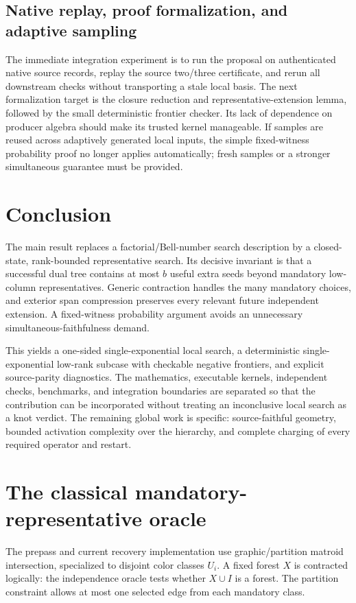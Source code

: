 \documentclass[11pt,letterpaper]{article}
\theoremstyle{definition}
\begin{document}
\subsection{Native replay, proof formalization, and adaptive sampling}
The immediate integration experiment is to run the proposal on authenticated
native source records, replay the source two/three certificate, and rerun
all downstream checks without transporting a stale local basis. The next
formalization target is the closure reduction and representative-extension
lemma, followed by the small deterministic frontier checker. Its lack of
dependence on producer algebra should make its trusted kernel manageable.
If samples are reused across adaptively generated local inputs, the simple
fixed-witness probability proof no longer applies automatically; fresh samples
or a stronger simultaneous guarantee must be provided.

\section{Conclusion}
The main result replaces a factorial/Bell-number search description by a
closed-state, rank-bounded representative search. Its decisive invariant is
that a successful dual tree contains at most $b$ useful extra seeds beyond
mandatory low-column representatives. Generic contraction handles the many
mandatory choices, and exterior span compression preserves every relevant
future independent extension. A fixed-witness probability argument avoids
an unnecessary simultaneous-faithfulness demand.

This yields a one-sided single-exponential local search, a deterministic
single-exponential low-rank subcase with checkable negative frontiers, and
explicit source-parity diagnostics. The mathematics, executable kernels,
independent checks, benchmarks, and integration boundaries are separated so
that the contribution can be incorporated without treating an inconclusive
local search as a knot verdict. The remaining global work is specific:
source-faithful geometry, bounded activation complexity over the hierarchy,
and complete charging of every required operator and restart.

\appendix
\section{The classical mandatory-representative oracle}\label{app:mi}
The prepass and current recovery implementation use graphic/partition
matroid intersection, specialized to disjoint color classes $U_i$. A fixed
forest $X$ is contracted logically: the independence oracle tests whether
$X\cup I$ is a forest. The partition constraint allows at most one selected
edge from each mandatory class.
\end{document}
